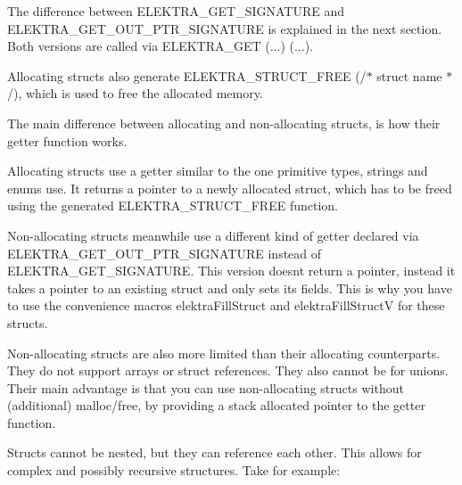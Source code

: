 The difference between {\ttfamily E\+L\+E\+K\+T\+R\+A\+\_\+\+G\+E\+T\+\_\+\+S\+I\+G\+N\+A\+T\+U\+RE} and {\ttfamily E\+L\+E\+K\+T\+R\+A\+\_\+\+G\+E\+T\+\_\+\+O\+U\+T\+\_\+\+P\+T\+R\+\_\+\+S\+I\+G\+N\+A\+T\+U\+RE} is explained in the next section. Both versions are called via {\ttfamily E\+L\+E\+K\+T\+R\+A\+\_\+\+G\+ET (...) (...)}.

Allocating structs also generate {\ttfamily E\+L\+E\+K\+T\+R\+A\+\_\+\+S\+T\+R\+U\+C\+T\+\_\+\+F\+R\+EE (/$\ast$ struct name $\ast$/)}, which is used to free the allocated memory.

The main difference between allocating and non-\/allocating structs, is how their getter function works.

Allocating structs use a getter similar to the one primitive types, strings and enums use. It returns a pointer to a newly allocated struct, which has to be freed using the generated {\ttfamily E\+L\+E\+K\+T\+R\+A\+\_\+\+S\+T\+R\+U\+C\+T\+\_\+\+F\+R\+EE} function.

Non-\/allocating structs meanwhile use a different kind of getter declared via {\ttfamily E\+L\+E\+K\+T\+R\+A\+\_\+\+G\+E\+T\+\_\+\+O\+U\+T\+\_\+\+P\+T\+R\+\_\+\+S\+I\+G\+N\+A\+T\+U\+RE} instead of {\ttfamily E\+L\+E\+K\+T\+R\+A\+\_\+\+G\+E\+T\+\_\+\+S\+I\+G\+N\+A\+T\+U\+RE}. This version doesn\textquotesingle{}t return a pointer, instead it takes a pointer to an existing struct and only sets its fields. This is why you have to use the convenience macros {\ttfamily elektra\+Fill\+Struct} and {\ttfamily elektra\+Fill\+StructV} for these structs.

Non-\/allocating structs are also more limited than their allocating counterparts. They do not support arrays or struct references. They also cannot be for unions. Their main advantage is that you can use non-\/allocating structs without (additional) {\ttfamily malloc}/{\ttfamily free}, by providing a stack allocated pointer to the getter function.

Structs cannot be nested, but they can reference each other. This allows for complex and possibly recursive structures. Take for example\+:


\begin{DoxyCode}{0}
\DoxyCodeLine{[person/\#]}
\DoxyCodeLine{}
\DoxyCodeLine{}
\DoxyCodeLine{}
\DoxyCodeLine{}
\end{DoxyCode}


